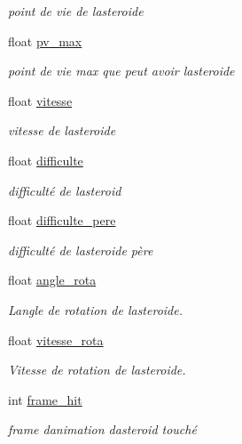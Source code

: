 \begin{DoxyCompactItemize}
\begin{DoxyCompactList}\small\item\em point de vie de l\textquotesingle{}asteroide \end{DoxyCompactList}\item 
float \hyperlink{struct_asteroid_a1dbbd3e9c9efb1029ef94f7dafbeb095}{pv\+\_\+max}
\begin{DoxyCompactList}\small\item\em point de vie max que peut avoir l\textquotesingle{}asteroide \end{DoxyCompactList}\item 
float \hyperlink{struct_asteroid_ab6210a24945033bd4db07a18e9588345}{vitesse}
\begin{DoxyCompactList}\small\item\em vitesse de l\textquotesingle{}asteroide \end{DoxyCompactList}\item 
float \hyperlink{struct_asteroid_a06f6075025efc690d9df3e4446811aa9}{difficulte}
\begin{DoxyCompactList}\small\item\em difficulté de l\textquotesingle{}asteroid \end{DoxyCompactList}\item 
float \hyperlink{struct_asteroid_ac935b81631199a1ac20ef87fff684025}{difficulte\+\_\+pere}
\begin{DoxyCompactList}\small\item\em difficulté de l\textquotesingle{}asteroide père \end{DoxyCompactList}\item 
float \hyperlink{struct_asteroid_aa4566a498bb89428a50e66cb578e4f3a}{angle\+\_\+rota}
\begin{DoxyCompactList}\small\item\em L\textquotesingle{}angle de rotation de l\textquotesingle{}asteroide. \end{DoxyCompactList}\item 
float \hyperlink{struct_asteroid_a87c9849fb621dd040f5e93e25dab80ff}{vitesse\+\_\+rota}
\begin{DoxyCompactList}\small\item\em Vitesse de rotation de l\textquotesingle{}asteroide. \end{DoxyCompactList}\item 
int \hyperlink{struct_asteroid_a6ebfa25ce73be7413f016eb1df89e789}{frame\+\_\+hit}
\begin{DoxyCompactList}\small\item\em frame d\textquotesingle{}animation d\textquotesingle{}asteroid touché \end{DoxyCompactList}\item 

\end{DoxyCompactItemize}
